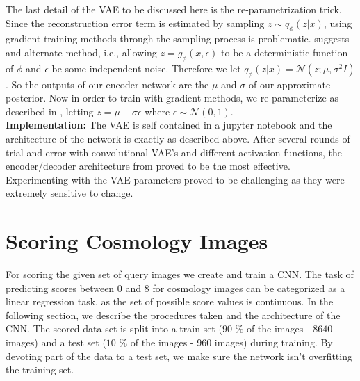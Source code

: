 \documentclass[journal]{IEEEtran}
\begin{document}
The last detail of the VAE to be discussed here is the re-parametrization trick. Since the reconstruction error term is estimated by sampling $z\sim q_\phi(z|x)$, using gradient training methods through the sampling process is problematic.\cite{AEVB} suggests and alternate method, i.e., allowing $z=g_\phi(x,\epsilon)$ to be a deterministic function of $\phi$ and $\epsilon$ be some independent noise. Therefore we let $q_\phi(z|x)=\mathcal{N}(z;\mu,\sigma^2 I)$. So the outputs of our encoder network are the $\mu$ and $\sigma$ of our approximate posterior. Now in order to train with gradient methods, we re-parameterize as described in \cite{AEVB}, letting $z=\mu + \sigma\epsilon$ where $\epsilon \sim \mathcal{N}(0,1)$.
\hfill\\
\textbf{Implementation:}
The VAE is self contained in a jupyter notebook and the architecture of the network is exactly as described above. After several rounds of trial and error with convolutional VAE's and different activation functions, the encoder/decoder architecture from \cite{bluebelmont} proved to be the most effective.
Experimenting with the VAE parameters proved to be challenging as they were extremely sensitive to change.
\section{Scoring Cosmology Images}
\label{sec:scoring}
For scoring the given set of query images we create and train a CNN. The task of predicting scores between $0$ and $8$ for cosmology images can be categorized as a linear regression task, as the set of possible score values is continuous. In the following section, we describe the procedures taken and the architecture of the CNN. The scored data set is split into a train set ($90$ \% of the images - $8640$ images) and a test set ($10$ \% of the images - $960$ images) during training. By devoting part of the data to a test set, we make sure the network isn't overfitting the training set.       
\hfill\\
\end{document}
